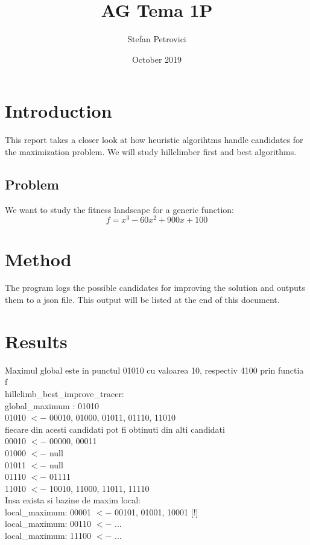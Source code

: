 \documentclass{article}
\title{AG Tema 1P}
\author{Stefan Petrovici}
\date{October 2019}
\begin{document}
\maketitle

\section{Introduction}
This report takes a closer look at how heuristic algorihtms handle candidates for the maximization problem. We will study hillclimber first and best algorithms.

\subsection{Problem}
We want to study the fitness landscape for a generic function: $$ f=x^3-60x^2+900x+100 $$

\section{Method}
The program logs the possible candidates for improving the solution and outputs them to a json file. This output will be listed at the end of this document.

\section{Results}
Maximul global este in punctul 01010 cu valoarea 10, respectiv 4100 prin functia f \\

hillclimb\_best\_improve\_tracer: \\
global\_maximum : 01010 \\
01010 $<-$ 00010, 01000, 01011, 01110, 11010 \\
fiecare din acesti candidati pot fi obtinuti din alti candidati \\
00010 $<-$ 00000, 00011 \\
01000 $<-$ null \\
01011 $<-$ null \\
01110 $<-$ 01111 \\
11010 $<-$ 10010, 11000, 11011, 11110 \\
Insa exista si bazine de maxim local: \\

local\_maximum: 00001 $<-$ 00101, 01001, 10001 [!] \\
local\_maximum: 00110 $<-$ ... \\
local\_maximum: 11100 $<-$ ... \\
\end{document}
